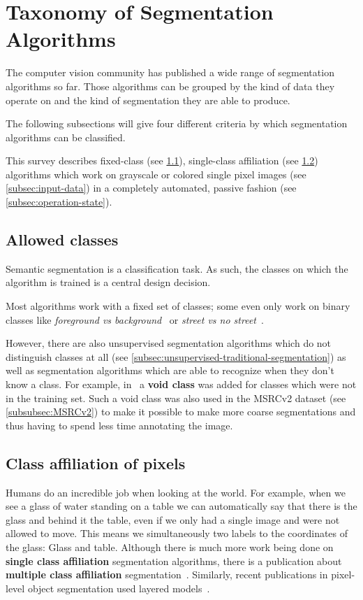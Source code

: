 
\section{Taxonomy of Segmentation Algorithms}\label{sec:taxonomy}
The computer vision community has published a wide range of segmentation
algorithms so far. Those algorithms can be grouped by the kind of data they
operate on and the kind of segmentation they are able to produce.

The following subsections will give four different criteria by which
segmentation algorithms can be classified.

This survey describes fixed-class (see \cref{subsec:allowed-classes}),
single-class affiliation (see \cref{subsec:class-affiliation}) algorithms which
work on grayscale or colored single pixel images (see \cref{subsec:input-data})
in a completely automated, passive fashion (see \cref{subsec:operation-state}).


\subsection{Allowed classes}\label{subsec:allowed-classes}
Semantic segmentation is a classification task. As such, the classes on which
the algorithm is trained is a central design decision.

Most algorithms work with a fixed set of classes; some even only work on binary
classes like \textit{foreground vs
background}~\cite{4228537,carreira2010constrained} or \textit{street vs no
street}~\cite{bittel2015pixel}.

However, there are also unsupervised segmentation algorithms which do not
distinguish classes at all (see
\cref{subsec:unsupervised-traditional-segmentation}) as well as segmentation
algorithms which are able to recognize when they don't know a class. For
example, in~\cite{gould2008multi} a
\textbf{void class} was added for classes which were not in the training set.
Such a void class was also used in the MSRCv2 dataset (see
\cref{subsubsec:MSRCv2}) to make it possible to make more coarse segmentations
and thus having to spend less time annotating the image.


\subsection{Class affiliation of pixels}\label{subsec:class-affiliation}
Humans do an incredible job when looking at the world. For example, when we see
a glass of water standing on a table we can automatically say that there is the
glass and behind it the table, even if we only had a single image and were not
allowed to move. This means we simultaneously two labels to the coordinates of
the glass: Glass and table. Although there is much more work being done on
\textbf{single class affiliation} segmentation algorithms, there is a
publication about \textbf{multiple class affiliation}
segmentation~\cite{levin2008spectral}. Similarly, recent publications in
pixel-level object segmentation used layered models~\cite{yang2012layered}.

